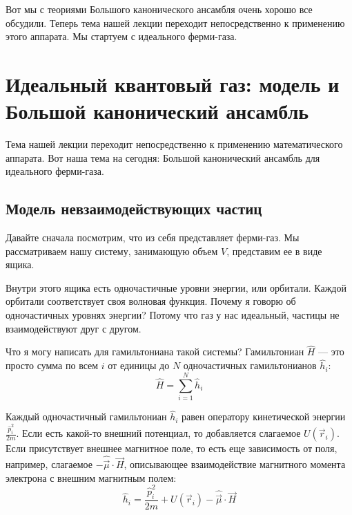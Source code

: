 \documentclass[../general/general]{subfiles}
\begin{document}
Вот мы с теориями Большого канонического ансамбля очень хорошо все обсудили. Теперь тема нашей лекции переходит непосредственно к применению этого аппарата. Мы стартуем с идеального ферми-газа.








\section{Идеальный квантовый газ: модель и Большой канонический ансамбль}

Тема нашей лекции переходит непосредственно к применению математического аппарата. Вот наша тема на сегодня: Большой канонический ансамбль для идеального ферми-газа.

\subsection{Модель невзаимодействующих частиц}

Давайте сначала посмотрим, что из себя представляет ферми-газ. Мы рассматриваем нашу систему, занимающую объем $V$, представим ее в виде ящика.


Внутри этого ящика есть одночастичные уровни энергии, или орбитали. Каждой орбитали соответствует своя волновая функция. Почему я говорю об одночастичных уровнях энергии? Потому что газ у нас идеальный, частицы не взаимодействуют друг с другом.

Что я могу написать для гамильтониана такой системы? Гамильтониан $\hat{H}$ — это просто сумма по всем $i$ от единицы до $N$ одночастичных гамильтонианов $\hat{h}_i$:
\begin{equation}
    \hat{H} = \sum_{i=1}^N \hat{h}_i
\end{equation}

Каждый одночастичный гамильтониан $\hat{h}_i$ равен оператору кинетической энергии $\frac{\hat{p}_i^2}{2m}$. Если есть какой-то внешний потенциал, то добавляется слагаемое $U(\vec{r}_i)$. Если присутствует внешнее магнитное поле, то есть еще зависимость от поля, например, слагаемое $-\hat{\vec{\mu}} \cdot \vec{H}$, описывающее взаимодействие магнитного момента электрона с внешним магнитным полем:
\begin{equation}
    \hat{h}_i = \frac{\hat{p}_i^2}{2m} + U(\vec{r}_i) - \hat{\vec{\mu}} \cdot \vec{H}
\end{equation}
\end{document}
